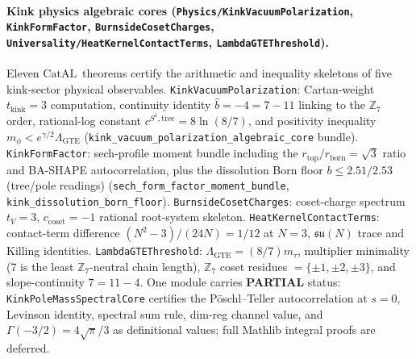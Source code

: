 \documentclass[11pt,a4paper]{article}
\theoremstyle{definition}
\newcommand{\CatAL}{\ensuremath{\mathrm{CatAL}}}
\begin{document}
\paragraph{Kink physics algebraic cores
  (\texttt{Physics/\allowbreak KinkVacuumPolarization},
  \texttt{KinkFormFactor}, \texttt{BurnsideCosetCharges},
  \texttt{Universality/\allowbreak HeatKernelContactTerms},
  \texttt{LambdaGTEThreshold}).}
Eleven \CatAL\ theorems certify the arithmetic and inequality skeletons of
five kink-sector physical observables.
\texttt{KinkVacuumPolarization}: Cartan-weight $t_{\mathrm{kink}}=3$ computation,
continuity identity $\hat{b}=-4=7-11$ linking to the $\mathbb{Z}_7$ order,
rational-log constant $c^{S^1,\mathrm{tree}}=8\ln(8/7)$, and positivity
inequality $m_\phi<e^{\gamma/2}\Lambda_{\mathrm{GTE}}$
(\texttt{kink\_vacuum\_polarization\_algebraic\_core} bundle).
\texttt{KinkFormFactor}: sech-profile moment bundle including the $r_{\mathrm{top}}/r_{\mathrm{born}}=\sqrt{3}$ ratio and BA-SHAPE autocorrelation, plus the
dissolution Born floor $b\le 2.51/2.53$ (tree/pole readings)
(\texttt{sech\_form\_factor\_moment\_bundle}, \texttt{kink\_dissolution\_born\_floor}).
\texttt{BurnsideCosetCharges}: coset-charge spectrum $t_V=3$,
$c_{\mathrm{coset}}=-1$ rational root-system skeleton.
\texttt{HeatKernelContactTerms}: contact-term difference $(N^2{-}3)/(24N)=1/12$
at $N=3$, $\mathfrak{su}(N)$ trace and Killing identities.
\texttt{LambdaGTEThreshold}: $\Lambda_{\mathrm{GTE}}=(8/7)m_\tau$, multiplier
minimality (7 is the least $\mathbb{Z}_7$-neutral chain length), $\mathbb{Z}_7$
coset residues $=\{\pm1,\pm2,\pm3\}$, and slope-continuity $7=11-4$.
One module carries \textbf{PARTIAL} status: \texttt{KinkPoleMassSpectralCore}
certifies the Pöschl--Teller autocorrelation at $s{=}0$, Levinson identity,
spectral sum rule, dim-reg channel value, and $\Gamma(-3/2)=4\sqrt{\pi}/3$
as definitional values; full Mathlib integral proofs are deferred.
\end{document}
